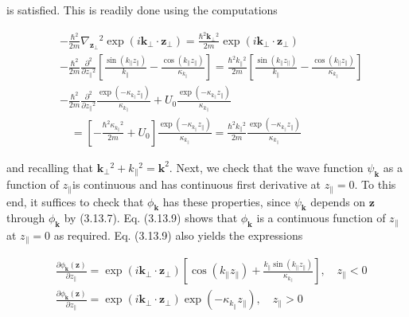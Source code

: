 \documentclass{article}
\begin{document}
is satisfied. This is readily done using the computations
 
\begin{align*}
& -\frac{\hbar^{2}}{2 m} \nabla_{\boldsymbol{z}_{\perp}}{ }^{2} \exp \left(i \boldsymbol{k}_{\perp} \cdot \boldsymbol{z}_{\perp}\right)=\frac{\hbar^{2} \boldsymbol{k}_{\perp}{ }^{2}}{2 m} \exp \left(i \boldsymbol{k}_{\perp} \cdot \boldsymbol{z}_{\perp}\right)  \tag{3.13.14}\\
& -\frac{\hbar^{2}}{2 m} \frac{\partial^{2}}{\partial z_{\|}{ }^{2}}\left[\frac{\sin \left(k_{\|} z_{\|}\right)}{k_{\|}}-\frac{\cos \left(k_{\|} z_{\|}\right)}{\kappa_{k_{\|}}}\right]=\frac{\hbar^{2} k_{\|}{ }^{2}}{2 m}\left[\frac{\sin \left(k_{\|} z_{\|}\right)}{k_{\|}}-\frac{\cos \left(k_{\|} z_{\|}\right)}{\kappa_{k_{\|}}}\right]  \tag{3.13.15}\\
& -\frac{\hbar^{2}}{2 m} \frac{\partial^{2}}{\partial z_{\|}{ }^{2}} \frac{\exp \left(-\kappa_{k_{\|}} z_{\|}\right)}{\kappa_{k_{\|}}}+U_{0} \frac{\exp \left(-\kappa_{k_{\|}} z_{\|}\right)}{\kappa_{k_{\|}}}  \tag{3.13.16}\\
& \quad=\left[-\frac{\hbar^{2} \kappa_{k_{\|}}{ }^{2}}{2 m}+U_{0}\right] \frac{\exp \left(-\kappa_{k_{\|}} z_{\|}\right)}{\kappa_{k_{\|}}}=\frac{\hbar^{2} k_{\|}{ }^{2}}{2 m} \frac{\exp \left(-\kappa_{k_{\|}} z_{\|}\right)}{\kappa_{k_{\|}}}
\end{align*}
 
and recalling that $\boldsymbol{k}_{\perp}{ }^{2}+k_{\|}{ }^{2}=\boldsymbol{k}^{2}$.
Next, we check that the wave function $\psi_{\boldsymbol{k}}$ as a function of $z_{\|}$is continuous and has continuous first derivative at $z_{\|}=0$. To this end, it suffices to check that $\phi_{\boldsymbol{k}}$ has these properties, since $\psi_{\boldsymbol{k}}$ depends on $\boldsymbol{z}$ through $\phi_{\boldsymbol{k}}$ by (3.13.7). Eq. (3.13.9) shows that $\phi_{\boldsymbol{k}}$ is a continuous function of $z_{\|}$at $z_{\|}=0$ as required. Eq. (3.13.9) also yields the expressions
 
\begin{align*}
& \frac{\partial \phi_{\boldsymbol{k}}(\boldsymbol{z})}{\partial z_{\|}}=\exp \left(i \boldsymbol{k}_{\perp} \cdot \boldsymbol{z}_{\perp}\right)\left[\cos \left(k_{\|} z_{\|}\right)+\frac{k_{\|} \sin \left(k_{\|} z_{\|}\right)}{\kappa_{k_{\|}}}\right], \quad z_{\|}<0  \tag{3.13.17}\\
& \frac{\partial \phi_{\boldsymbol{k}}(\boldsymbol{z})}{\partial z_{\|}}=\exp \left(i \boldsymbol{k}_{\perp} \cdot \boldsymbol{z}_{\perp}\right) \exp \left(-\kappa_{k_{\|}} z_{\|}\right), \quad z_{\|}>0
\end{align*}
 
\end{document}
